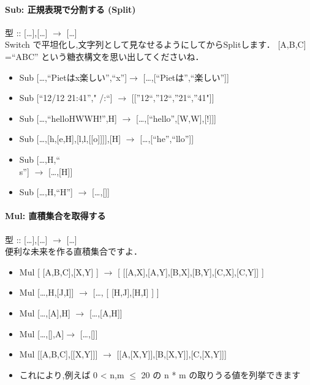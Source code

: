 \paragraph{Sub: 正規表現で分割する (Split)}

型 :: {[}\ldots{}{]},{[}\ldots{}{]} $\to$
{[}\ldots{}{]}\\Switch
で平坦化し,文字列として見なせるようにしてからSplitします． {[}A,B,C{]}
=``ABC'' という糖衣構文を思い出してくださいね．

\begin{itemize}
\item
  Sub {[}\ldots{},``Pietはx楽しい'',``x''{]}$\to$
  {[}\ldots{},{[}``Pietは'',``楽しい''{]}{]}
\item
  Sub {[}``12/12 21:41''," \textbar{}/\textbar{}:``{]} $\to$
  {[}{[}''12``,''12``,''21``,''41"{]}{]}
\item
  Sub {[}\ldots{},``helloHWWH!'',H{]} $\to$
  {[}\ldots{},{[}``hello'',{[}W,W{]},{[}!{]}{]}{]}
\item
  Sub {[}\ldots{},{[}h,{[}e,H{]},{[}l,l,{[}{[}o{]}{]}{]}{]},{[}H{]}
  $\to$ {[}\ldots{},{[}``he'',``llo''{]}{]}
\item
  Sub {[}\ldots{},H,``\\s''{]} $\to$ {[}\ldots{},{[}H{]}{]}
\item
  Sub {[}\ldots{},H,``H''{]} $\to$ {[}\ldots{},{[}{]}{]}
\end{itemize}

\paragraph{Mul: 直積集合を取得する}

型 :: {[}\ldots{}{]},{[}\ldots{}{]} $\to$
{[}\ldots{}{]}\\便利な未来を作る直積集合ですよ．

\begin{itemize}
\item
  Mul {[} {[}A,B,C{]},{[}X,Y{]} {]} $\to$ {[}
  {[}{[}A,X{]},{[}A,Y{]},{[}B,X{]},{[}B,Y{]},{[}C,X{]},{[}C,Y{]}{]} {]}
\item
  Mul {[}\ldots{},H,{[}J,I{]}{]} $\to$ {[}\ldots{}, {[}
  {[}H,J{]},{[}H,I{]} {]} {]}
\item
  Mul {[}\ldots{},{[}A{]},H{]} $\to$ {[}\ldots{},{[}A,H{]}{]}
\item
  Mul {[}\ldots{},{[}{]},A{]}$\to$ {[}\ldots{},{[}{]}{]}
\item
  Mul {[}{[}A,B,C{]},{[}{[}X,Y{]}{]}{]} $\to$
  {[}{[}A,{[}X,Y{]}{]},{[}B,{[}X,Y{]}{]},{[}C,{[}X,Y{]}{]}{]}
\item
  これにより,例えば 0 \textless{} n,m $\leq$ 20 の n * m
  の取りうる値を列挙できます
\end{itemize}

